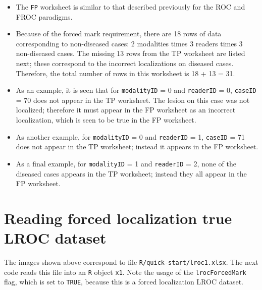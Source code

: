 \documentclass[
]{book}
\providecommand{\tightlist}{%
  \setlength{\itemsep}{0pt}\setlength{\parskip}{0pt}}
\begin{document}
\begin{itemize}
\tightlist
\item
  The \texttt{FP} worksheet is similar to that described previously for the ROC and FROC paradigms.
\item
  Because of the forced mark requirement, there are 18 rows of data corresponding to non-diseased cases: 2 modalities times 3 readers times 3 non-diseased cases. The missing 13 rows from the TP worksheet are listed next; these correspond to the incorrect localizations on diseased cases. Therefore, the total number of rows in this worksheet is 18 + 13 = 31.
\item
  As an example, it is seen that for \texttt{modalityID} = 0 and \texttt{readerID} = 0, \texttt{caseID} = 70 does not appear in the TP worksheet. The lesion on this case was not localized; therefore it must appear in the FP worksheet as an incorrect localization, which is seen to be true in the FP worksheet.
\item
  As another example, for \texttt{modalityID} = 0 and \texttt{readerID} = 1, \texttt{caseID} = 71 does not appear in the TP worksheet; instead it appears in the FP worksheet.
\item
  As a final example, for \texttt{modalityID} = 1 and \texttt{readerID} = 2, none of the diseased cases appears in the TP worksheet; instead they all appear in the FP worksheet.
\end{itemize}

\hypertarget{quick-start-lroc-data-1}{%
\section{Reading forced localization true LROC dataset}\label{quick-start-lroc-data-1}}

The images shown above correspond to file \texttt{R/quick-start/lroc1.xlsx}. The next code reads this file into an \texttt{R} object \texttt{x1}. Note the usage of the \texttt{lrocForcedMark} flag, which is set to \texttt{TRUE}, because this is a forced localization LROC dataset.
\end{document}
